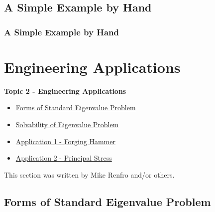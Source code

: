 \documentclass[fleqn]{beamer} %
\newcommand{\sectionIItitle}{Engineering Applications}
\newcommand{\sectionIsubsectionIVtitle}{A Simple Example by Hand}
\newcommand{\sectionIIsubsectionItitle}{Forms of Standard Eigenvalue Problem}
\newcommand{\sectionIIsubsectionIItitle}{Solvability of Eigenvalue Problem}
\newcommand{\sectionIIsubsectionIIItitle}{Application 1 - Forging Hammer}
\newcommand{\sectionIIsubsectionIVtitle}{Application 2 - Principal Stress}
\begin{document}
		\subsection{\sectionIsubsectionIVtitle}\label{sectionIsubsectionIV}	

			\begin{frame}
				\frametitle{\sectionIsubsectionIVtitle}
				\bigskip


				\btVFill
			\end{frame}
	
	\section{\sectionIItitle}\label{sectionII}

		\begin{frame}
			\large \textbf{Topic 2 - \sectionIItitle} \vspace{3mm}\\

			\begin{itemize}
				\item \hyperlink{sectionIIsubsectionI}{\sectionIIsubsectionItitle} \vspc %
				\item \hyperlink{sectionIIsubsectionII}{\sectionIIsubsectionIItitle} \vspc %
				\item \hyperlink{sectionIIsubsectionIII}{\sectionIIsubsectionIIItitle} \vspc %
				\item \hyperlink{sectionIIsubsectionIV}{\sectionIIsubsectionIVtitle} \vspc %
			\end{itemize}

			This section was written by Mike Renfro and/or others.

		\end{frame}

		\subsection{\sectionIIsubsectionItitle}\label{sectionIIsubsectionI}
\end{document}
